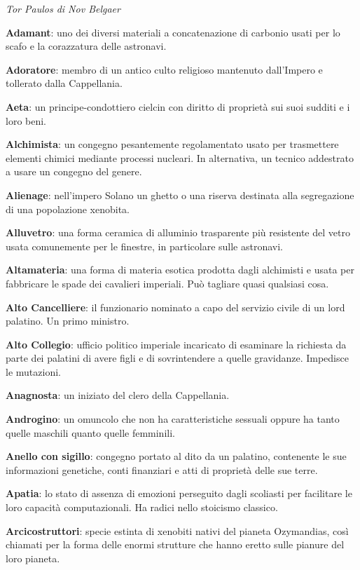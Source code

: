 \emph{Tor Paulos di Nov Belgaer}

\textbf{Adamant}: uno dei diversi materiali a concatenazione di carbonio
usati per lo scafo e la corazzatura delle astronavi.

\textbf{Adoratore}: membro di un antico culto religioso mantenuto
dall'Impero e tollerato dalla Cappellania.

\textbf{Aeta}: un principe-condottiero cielcin con diritto di proprietà
sui suoi sudditi e i loro beni.

\textbf{Alchimista}: un congegno pesantemente regolamentato usato per
trasmettere elementi chimici mediante processi nucleari. In alternativa,
un tecnico addestrato a usare un congegno del genere.

\textbf{Alienage}: nell'impero Solano un ghetto o una riserva destinata
alla segregazione di una popolazione xenobita.

\textbf{Alluvetro}: una forma ceramica di alluminio trasparente più
resistente del vetro usata comunemente per le finestre, in particolare
sulle astronavi.

\textbf{Altamateria}: una forma di materia esotica prodotta dagli
alchimisti e usata per fabbricare le spade dei cavalieri imperiali. Può
tagliare quasi qualsiasi cosa.

\textbf{Alto Cancelliere}: il funzionario nominato a capo del servizio
civile di un lord palatino. Un primo ministro.

\textbf{Alto Collegio}: ufficio politico imperiale incaricato di
esaminare la richiesta da parte dei palatini di avere figli e di
sovrintendere a quelle gravidanze. Impedisce le mutazioni.

\textbf{Anagnosta}: un iniziato del clero della Cappellania.

\textbf{Androgino}: un omuncolo che non ha caratteristiche sessuali
oppure ha tanto quelle maschili quanto quelle femminili.

\textbf{Anello con sigillo}: congegno portato al dito da un palatino,
contenente le sue informazioni genetiche, conti finanziari e atti di
proprietà delle sue terre.

\textbf{Apatia}: lo stato di assenza di emozioni perseguito dagli
scoliasti per facilitare le loro capacità computazionali. Ha radici
nello stoicismo classico.

\textbf{Arcicostruttori}: specie estinta di xenobiti nativi del pianeta
Ozymandias, così chiamati per la forma delle enormi strutture che hanno
eretto sulle pianure del loro pianeta.

